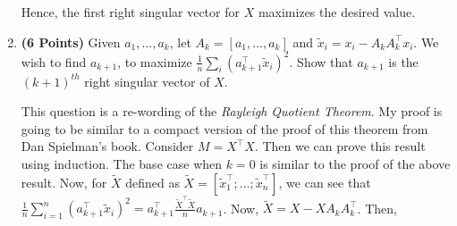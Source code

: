 \documentclass[a4paper]{article}
\theoremstyle{definition}
\newenvironment{soln}{
    \leavevmode\color{blue}\ignorespaces
}{}
\begin{document}
\begin{enumerate}
\begin{soln}
    Hence, the first right singular vector for $X$ maximizes the desired value.
\end{soln}

\item  \textbf{(6 Points)}
Given $a_1, \dots, a_k$, let $A_k = [a_1, \dots, a_k]$ and 
$\tilde{x}_i = x_i - A_kA_k^\top x_i$. We wish to find $a_{k+1}$, to maximize
$\frac{1}{n} \sum_i (a_{k+1}^\top \tilde{x}_i)^2$. Show that $a_{k+1}$ is the
$(k+1)^{th}$ right singular vector of $X$.

\begin{soln}
    This question is a re-wording of the \emph{Rayleigh Quotient Theorem}. My proof is going to be similar to a compact version of the proof of this theorem from Dan Spielman's book. Consider $M = X^\top X$. Then we can prove this result using induction. The base case when $k = 0$ is similar to the proof of the above result. Now, for $\tilde{X}$ defined as $\tilde{X} = [\tilde{x}_1^\top ; \ldots ; \tilde{x}_n^\top]$, we can see that $\frac{1}{n} \sum\limits_{i = 1}^{n} (a_{k+1}^\top \tilde{x}_i)^2 = a_{k+1}^\top \frac{\tilde{X}^\top \tilde{X}}{n} a_{k+1}$. Now, $\tilde{X} = X - X A_k A_k^\top$. Then,


\end{soln}
\end{enumerate}
\end{document}

